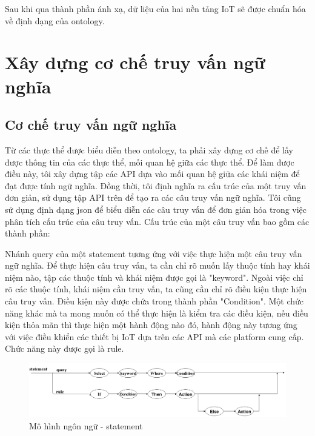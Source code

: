 Sau khi qua thành phần ánh xạ, dữ liệu của hai nền tảng IoT sẽ được chuẩn hóa về định dạng của ontology.
\section{Xây dựng cơ chế truy vấn ngữ nghĩa}
\subsection{Cơ chế truy vấn ngữ nghĩa}
Từ các thực thể được biểu diễn theo ontology, ta phải xây dựng cơ chế để lấy được thông tin của các thực thể, mối quan hệ giữa các thực thể. Để làm được điều này, tôi xây dựng tập các API dựa vào mối quan hệ giữa các khái niệm để đạt được tính ngữ nghĩa. Đồng thời, tôi định nghĩa ra cấu trúc của một truy vấn đơn giản, sử dụng tập API trên để tạo ra các câu truy vấn ngữ nghĩa. Tôi cũng sử dụng định dạng json để biểu diễn các câu truy vấn để đơn giản hóa trong việc phân tích cấu trúc của câu truy vấn. Cấu trúc của một câu truy vấn bao gồm các thành phần: 

Nhánh query của một statement tương ứng với việc thực hiện một câu truy vấn ngữ nghĩa. Để thực hiện câu truy vấn, ta cần chỉ rõ muốn lấy thuộc tính hay khái niệm nào, tập các thuộc tính và khái niệm được gọi là "keyword". Ngoài việc chỉ rõ các thuộc tính, khái niệm cần truy vấn, ta cũng cần chỉ rõ điều kiện thực hiện câu truy vấn. Điều kiện này được chứa trong thành phần "Condition". Một chức năng khác mà ta mong muốn có thể thực hiện là kiểm tra các điều kiện, nếu điều kiện thỏa mãn thì thực hiện một hành động nào đó, hành động này tương ứng với việc điều khiển các thiết bị IoT dựa trên các API mà các platform cung cấp. Chức năng này được gọi là rule.


\begin{figure}[h!]
	\center
	\includegraphics[scale=0.3]{image/language_model-statement}
	\caption{Mô hình ngôn ngữ - statement}
\end{figure}

